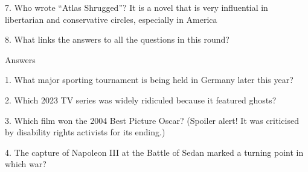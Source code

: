 \begin{frame}
\begin{center}
\Large
7. Who wrote ``Atlas Shrugged''? It is a novel that is very influential in libertarian and conservative circles, especially in America
\end{center}
\end{frame}
\begin{frame}
\begin{center}
\Large
8. What links the answers to all the questions in this round?
\end{center}
\end{frame}
\begin{frame}
\begin{center}
\Huge
Answers
\end{center}
\end{frame}
\begin{frame}
\begin{center}
\Large
1. What major sporting tournament is being held in Germany later this year?
\\
\end{center}
\end{frame}
\begin{frame}
\begin{center}
\Large
2. Which 2023 TV series was widely ridiculed because it featured ghosts?
\\
\end{center}
\end{frame}
\begin{frame}
\begin{center}
\Large
3. Which film won the 2004 Best Picture Oscar? (Spoiler alert! It was criticised by disability rights activists for its ending.)
\\
\end{center}
\end{frame}
\begin{frame}
\begin{center}
\Large
4. The capture of Napoleon III at the Battle of Sedan marked a turning point in which war?
\\
\end{center}
\end{frame}
